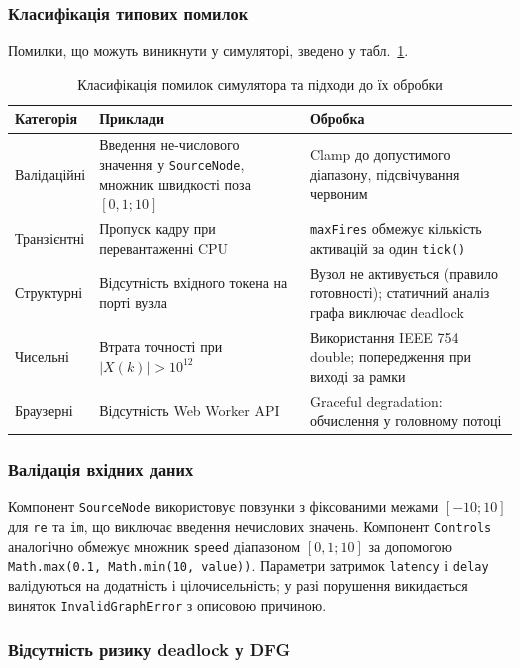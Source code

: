 \subsubsection*{Класифікація типових помилок}

Помилки, що можуть виникнути у симуляторі, зведено у
табл.~\ref{tab:errors}.

\begin{table}[H]
  \caption{Класифікація помилок симулятора та підходи до їх обробки}
  \label{tab:errors}
  \centering
  \small
  \begin{tabular}{p{2.8cm}p{4.0cm}p{5.6cm}}
    \toprule
    Категорія & Приклади & Обробка \\
    \midrule
    Валідаційні & Введення не-числового значення у \texttt{SourceNode}, множник швидкості поза $[0{,}1; 10]$ & Clamp до допустимого діапазону, підсвічування червоним \\
    Транзієнтні & Пропуск кадру при перевантаженні CPU & \texttt{maxFires} обмежує кількість активацій за один \texttt{tick()} \\
    Структурні & Відсутність вхідного токена на порті вузла & Вузол не активується (правило готовності); статичний аналіз графа виключає deadlock \\
    Чисельні & Втрата точності при $|X(k)| > 10^{12}$ & Використання IEEE 754 double; попередження при виході за рамки \\
    Браузерні & Відсутність Web Worker API & Graceful degradation: обчислення у головному потоці \\
    \bottomrule
  \end{tabular}
\end{table}

\subsubsection*{Валідація вхідних даних}

Компонент \texttt{SourceNode} використовує повзунки з фіксованими
межами $[-10; 10]$ для \texttt{re} та \texttt{im}, що виключає
введення нечислових значень. Компонент \texttt{Controls} аналогічно
обмежує множник \texttt{speed} діапазоном $[0{,}1; 10]$ за допомогою
\texttt{Math.max(0.1, Math.min(10, value))}. Параметри затримок
\texttt{latency} і \texttt{delay} валідуються на додатність і
цілочисельність; у разі порушення викидається виняток
\texttt{InvalidGraphError} з описовою причиною.

\subsubsection*{Відсутність ризику deadlock у DFG}

